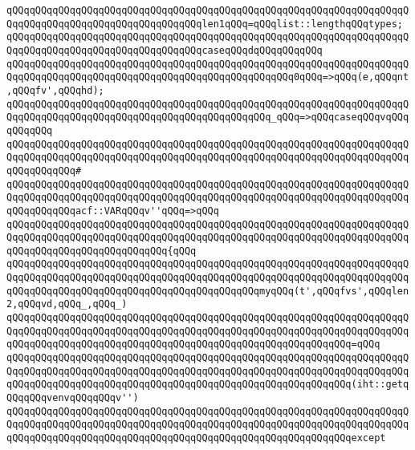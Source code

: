 \newline
\verb|qQQqqQQqqQQqqQQqqQQqqQQqqQQqqQQqqQQqqQQqqQQqqQQqqQQqqQQqqQQqqQQqqQQqqQQqqQQqqQQqqQQqqQQqqQQqqQQqqQQqqQQqlen1qQQq=qQQqlist::lengthqQQqtypes;|\newline
\newline
\verb|qQQqqQQqqQQqqQQqqQQqqQQqqQQqqQQqqQQqqQQqqQQqqQQqqQQqqQQqqQQqqQQqqQQqqQQqqQQqqQQqqQQqqQQqqQQqqQQqqQQqqQQqcaseqQQqdqQQqqQQqqQQq|\newline
\verb|qQQqqQQqqQQqqQQqqQQqqQQqqQQqqQQqqQQqqQQqqQQqqQQqqQQqqQQqqQQqqQQqqQQqqQQqqQQqqQQqqQQqqQQqqQQqqQQqqQQqqQQqqQQqqQQqqQQqqQQq0qQQq=>qQQq(e,qQQqnt,qQQqfv',qQQqhd);|\newline
\newline
\verb|qQQqqQQqqQQqqQQqqQQqqQQqqQQqqQQqqQQqqQQqqQQqqQQqqQQqqQQqqQQqqQQqqQQqqQQqqQQqqQQqqQQqqQQqqQQqqQQqqQQqqQQqqQQqqQQqqQQq_qQQq=>qQQqcaseqQQqvqQQqqQQqqQQq|\newline
\verb|qQQqqQQqqQQqqQQqqQQqqQQqqQQqqQQqqQQqqQQqqQQqqQQqqQQqqQQqqQQqqQQqqQQqqQQqqQQqqQQqqQQqqQQqqQQqqQQqqQQqqQQqqQQqqQQqqQQqqQQqqQQqqQQqqQQqqQQqqQQqqQQqqQQqqQQq#|\newline
\verb|qQQqqQQqqQQqqQQqqQQqqQQqqQQqqQQqqQQqqQQqqQQqqQQqqQQqqQQqqQQqqQQqqQQqqQQqqQQqqQQqqQQqqQQqqQQqqQQqqQQqqQQqqQQqqQQqqQQqqQQqqQQqqQQqqQQqqQQqqQQqqQQqqQQqqQQqacf::VARqQQqv''qQQq=>qQQq|\newline
\verb|qQQqqQQqqQQqqQQqqQQqqQQqqQQqqQQqqQQqqQQqqQQqqQQqqQQqqQQqqQQqqQQqqQQqqQQqqQQqqQQqqQQqqQQqqQQqqQQqqQQqqQQqqQQqqQQqqQQqqQQqqQQqqQQqqQQqqQQqqQQqqQQqqQQqqQQqqQQqqQQqqQQqqQQq{qQQq|\newline
\verb|qQQqqQQqqQQqqQQqqQQqqQQqqQQqqQQqqQQqqQQqqQQqqQQqqQQqqQQqqQQqqQQqqQQqqQQqqQQqqQQqqQQqqQQqqQQqqQQqqQQqqQQqqQQqqQQqqQQqqQQqqQQqqQQqqQQqqQQqqQQqqQQqqQQqqQQqqQQqqQQqqQQqqQQqqQQqqQQqqQQqqQQqmyqQQq(t',qQQqfvs',qQQqlen2,qQQqvd,qQQq_,qQQq_)|\newline
\verb|qQQqqQQqqQQqqQQqqQQqqQQqqQQqqQQqqQQqqQQqqQQqqQQqqQQqqQQqqQQqqQQqqQQqqQQqqQQqqQQqqQQqqQQqqQQqqQQqqQQqqQQqqQQqqQQqqQQqqQQqqQQqqQQqqQQqqQQqqQQqqQQqqQQqqQQqqQQqqQQqqQQqqQQqqQQqqQQqqQQqqQQqqQQqqQQqqQQqqQQq=qQQq|\newline
\verb|qQQqqQQqqQQqqQQqqQQqqQQqqQQqqQQqqQQqqQQqqQQqqQQqqQQqqQQqqQQqqQQqqQQqqQQqqQQqqQQqqQQqqQQqqQQqqQQqqQQqqQQqqQQqqQQqqQQqqQQqqQQqqQQqqQQqqQQqqQQqqQQqqQQqqQQqqQQqqQQqqQQqqQQqqQQqqQQqqQQqqQQqqQQqqQQqqQQqqQQq(iht::getqQQqqQQqvenvqQQqqQQqv'')|\newline
\verb|qQQqqQQqqQQqqQQqqQQqqQQqqQQqqQQqqQQqqQQqqQQqqQQqqQQqqQQqqQQqqQQqqQQqqQQqqQQqqQQqqQQqqQQqqQQqqQQqqQQqqQQqqQQqqQQqqQQqqQQqqQQqqQQqqQQqqQQqqQQqqQQqqQQqqQQqqQQqqQQqqQQqqQQqqQQqqQQqqQQqqQQqqQQqqQQqqQQqqQQqexcept|\newline
